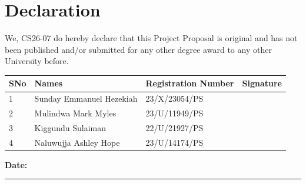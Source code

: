 \chapter*{Declaration}
We, CS26-07 do hereby declare that this Project Proposal is original
and has not been published and/or submitted for any other degree award to any
other University before.


\vspace{1.5cm}


{\selectfont

\begin{tabular}{|p{1cm}|p{6cm}|p{4.5cm}|p{3cm}|}
\hline

\textbf{SNo} & \textbf{Names} & \textbf{Registration Number} & \textbf{Signature} \\
\hline
1 & Sunday Emmanuel Hezekiah & 23/X/23054/PS & \\[0.3cm] \hline
2 & Mulindwa Mark Myles & 23/U/11949/PS & \\[0.3cm] \hline
3 & Kiggundu Sulaiman & 22/U/21927/PS & \\[0.3cm] \hline
4 & Naluwujja Ashley Hope & 23/U/14174/PS &
\\[0.3cm] \hline

\end{tabular}
}


\vspace{2cm}


\noindent

\textbf{Date:}\\
\rule{8cm}{0.4pt}


\vspace{3cm}
